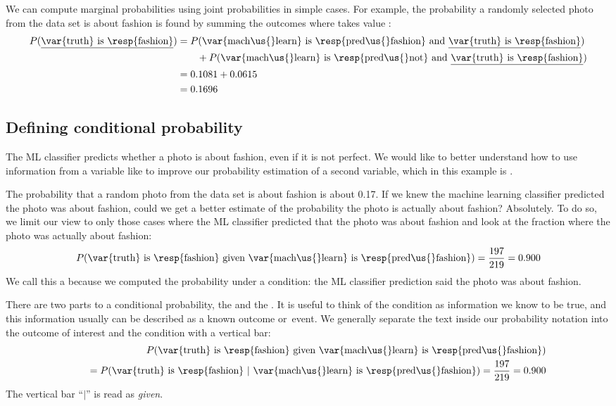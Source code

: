 We can compute marginal probabilities using joint probabilities
in simple cases.
For example, the probability a randomly selected photo from the
data set is about fashion is found by summing the outcomes where
 takes value :%
\newcommand{\ultruthfashion}[0]
    {\underline{\var{truth} is \resp{fashion}}}%
\begin{align*}
P(\text{\ultruthfashion{}})
  &= P(\text{\var{mach\us{}learn} is \resp{pred\us{}fashion}
        and \ultruthfashion{}}) \\
    & \qquad + P(\text{\var{mach\us{}learn} is \resp{pred\us{}not}
        and \ultruthfashion{}}) \\
  &= 0.1081 + 0.0615 \\
  &= 0.1696
\end{align*}


\subsection{Defining conditional probability}


The ML classifier predicts whether a photo is about fashion,
even if it is not perfect.
We would like to better understand how to use information
from a variable like  to improve our
probability estimation of a second variable, which in this
example is .

The probability that a random photo from the data set is about
fashion is about 0.17.
If we knew the machine learning classifier predicted the
photo was about fashion, could we get a better estimate of the
probability the photo is actually about fashion?
Absolutely.
To do so, we limit our view to only those \fashYA{} cases
where the ML classifier predicted that the photo was about
fashion and look at the fraction where the photo was actually
about fashion:
\begin{eqnarray*}
P(\text{\var{truth} is \resp{fashion} given
    \var{mach\us{}learn} is \resp{pred\us{}fashion}})
  = \frac{\fashYY{}}{\fashYA{}}
  = 0.900
\end{eqnarray*}
We call this a  because
we computed the probability under a condition:
the ML classifier prediction said the photo was about fashion.

There are two parts to a conditional probability,
the  and the .
It is useful to think of the condition as information we know
to be true, and this information usually can be described as
a known outcome or~event.
We generally separate the text inside our probability notation
into the outcome of interest and the condition with a
vertical bar:
\begin{align*}
&& P(\text{\var{truth} is \resp{fashion} given
    \var{mach\us{}learn} is \resp{pred\us{}fashion}}) \\
&& \quad = P(\text{\var{truth} is \resp{fashion}\ }|
    \text{\ \var{mach\us{}learn} is \resp{pred\us{}fashion}})
  = \frac{\fashYY{}}{\fashYA{}}
  = 0.900
\end{align*}
The vertical bar ``$|$'' is read as \emph{given}.

